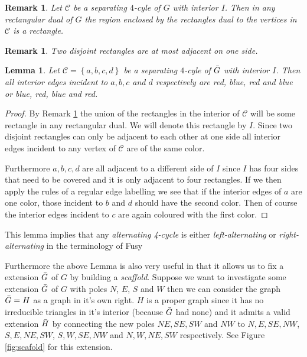 \documentclass[a4paper]{article}
\newtheorem{lemma}[thrm]{Lemma}
\newtheorem{remark}[thrm]{Remark}
\theoremstyle{definition}
\newcommand{\scr}[1]{\mathcal{#1}}
\newcommand{\C}{\scr C}
\newcommand{\braces}[1]{\left\lbrace {#1} \right\rbrace}
\newcommand{\Fusy}{Fusy}
\begin{document}
\begin{remark}
\label{re:interiorRectangle}
Let $\C$ be a separating $4$-cyle of $G$ with interior $I$. Then in any rectangular dual of $G$ the region enclosed by the rectangles dual to the vertices in $\C$ is a rectangle.
\end{remark}

\begin{remark}
\label{re:disjointRectanglesOnlyHaveOneAdjecentSide}
Two disjoint rectangles are at most adjacent on one side.
\end{remark}

\begin{lemma}
\label{lem:fourCycleUnicolor}
Let $\C = \braces{a, b, c, d}$ be a separating $4$-cyle of $\bar{G}$ with interior $I$. Then all interior edges incident to $a, b, c$ and $d$ respectively are red, blue, red and blue or blue, red, blue and red.
\end{lemma}

\begin{proof}
By Remark \ref{re:interiorRectangle} the union of the rectangles in the interior of $\C$ will be some rectangle in any rectangular dual. We will denote this rectangle by $I$. Since two disjoint rectangles can only be adjacent to each other at one side all interior edges incident to any vertex of $\C$ are of the same color. 

Furthermore $a, b, c, d$ are all adjacent to a different side of $I$ since $I$ has four sides that need to be covered and it is only adjacent to four rectangles. If we then apply the rules of a regular edge labelling we see that if the interior edges of $a$ are one color, those incident to $b$ and $d$ should have the second color. Then of course the interior edges incident to $c$ are again coloured with the first color. 

\end{proof}

This lemma implies that any \emph{alternating 4-cycle} %
is either \emph{left-alternating} or \emph{right-alternating} %
in the terminology of \Fusy

Furthermore the above Lemma is also very useful in that it allows us to fix a extension $\bar{G}$ of $G$ by building a \emph{scaffold}. Suppose we want to investigate some extension $\bar{G}$ of $G$ with poles $N$, $E$, $S$ and $W$ then we can consider the graph $\bar{G} = H$ as a graph in it's own right. $H$ is a proper graph since it has no irreducible triangles in it's interior (because $\bar{G}$ had none) and it admits a valid extension $\bar{H}$ by connecting the new poles $NE, SE, SW$ and $NW$ to $N, E, SE, NW$, $S, E, NE, SW$, $S, W, SE, NW$ and $N, W, NE, SW$ respectively. See Figure \ref{fig:scafold} for this extension.  
\end{document}

